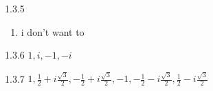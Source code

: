 \begin{Solution}{1.3.5}
	\begin{enumerate}[label = (\alph*)]
		\item i don't want to
	\end{enumerate}
\end{Solution}
\begin{Solution}{1.3.6}
	\(\boxed{1,i,-1,-i}\)	
\end{Solution}
\begin{Solution}{1.3.7}
	\(\boxed{1, \frac{1}{2}+i\frac{\sqrt{3}}{2}, -\frac{1}{2}+i\frac{\sqrt{3}}{2},-1,-\frac{1}{2}-i\frac{\sqrt{3}}{2},\frac{1}{2}-i\frac{\sqrt{3}}{2}}\)
\end{Solution}
